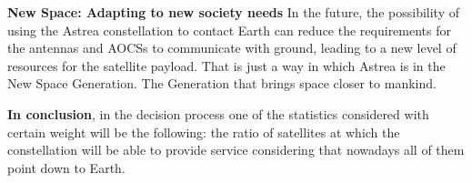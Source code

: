 \textbf{New Space: Adapting to new society needs}
In the future, the possibility of using the Astrea constellation to contact Earth can reduce the requirements for the antennas and AOCSs to communicate with ground, leading to a new level of resources for the satellite payload. That is just a way in which Astrea is in the New Space Generation. The Generation that brings space closer to mankind.

\textbf{In conclusion}, in the decision process one of the statistics considered with certain weight will be the following: the ratio of satellites at which the constellation will be able to provide service considering that nowadays all of them point down to Earth. 